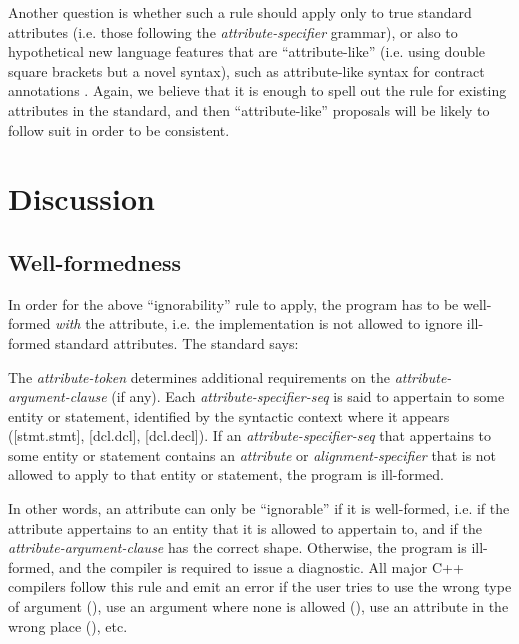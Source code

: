 Another question is whether such a rule should apply only to true standard attributes (i.e. those following the \emph{attribute-specifier} grammar), or also to hypothetical new language features that are ``attribute-like'' (i.e. using double square brackets but a novel syntax), such as attribute-like syntax for contract annotations \cite{P2461R1}. Again, we believe that it is enough to spell out the rule for existing attributes in the standard, and then ``attribute-like'' proposals will be likely to follow suit in order to be consistent.

\section{Discussion}

\subsection{Well-formedness}

In order for the above ``ignorability'' rule to apply, the program has to be well-formed \emph{with} the attribute, i.e. the implementation is not allowed to ignore ill-formed standard attributes. The standard says:

\begin{adjustwidth}{0.5cm}{0.5cm}
The \emph{attribute-token} determines additional requirements on the \emph{attribute-argument-clause} (if any). Each \emph{attribute-specifier-seq} is said to appertain to some entity or statement, identified by the syntactic context where it appears ([stmt.stmt], [dcl.dcl], [dcl.decl]). If an \emph{attribute-specifier-seq} that appertains to some entity or statement contains an \emph{attribute} or \emph{alignment-specifier} that is not allowed to apply to that entity or statement, the program is ill-formed.
\end{adjustwidth}

In other words, an attribute can only be ``ignorable'' if it is well-formed, i.e. if the attribute appertains to an entity that it is allowed to appertain to, and if the \emph{attribute-argument-clause} has the correct shape. Otherwise, the program is ill-formed, and the compiler is required to issue a diagnostic. All major C++ compilers follow this rule and emit an error if the user tries to use the wrong type of argument (\tcode{[[deprecated(42)]]}), use an argument where none is allowed (\tcode{[[noreturn("x")]]}), use an attribute in the wrong place (), etc.

